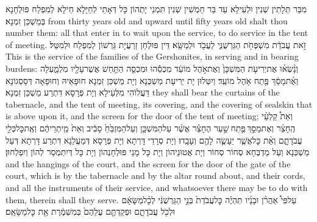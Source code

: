 {מִבַּר תְּלָתִין שְׁנִין וּלְעֵילָא עַד בַּר חַמְשִׁין שְׁנִין תִּמְנֵי יָתְהוֹן כָּל דְּאָתֵי לְחַיָּלָא חֵילָא לְמִפְלַח פּוּלְחָנָא בְּמַשְׁכַּן זִמְנָא׃}
{from thirty years old and upward until fifty years old shalt thou number them: all that enter in to wait upon the service, to do service in the tent of meeting.}{}
{זֹ֣את עֲבֹדַ֔ת מִשְׁפְּחֹ֖ת הַגֵּרְשֻׁנִּ֑י לַעֲבֹ֖ד וּלְמַשָּֽׂא׃}
{דֵּין פּוּלְחַן זַרְעֲיָת גֵּרְשׁוֹן לְמִפְלַח וּלְמִטַּל׃}
{This is the service of the families of the Gershonites, in serving and in bearing burdens:}{}
{וְנָ֨שְׂא֜וּ אֶת\maqqaf יְרִיעֹ֤ת הַמִּשְׁכָּן֙ וְאֶת\maqqaf אֹ֣הֶל מוֹעֵ֔ד מִכְסֵ֕הוּ וּמִכְסֵ֛ה הַתַּ֥חַשׁ אֲשֶׁר\maqqaf עָלָ֖יו מִלְמָ֑עְלָה וְאֶ֨ת\maqqaf מָסַ֔ךְ פֶּ֖תַח אֹ֥הֶל מוֹעֵֽד׃}
{וְיִטְּלוּן יָת יְרִיעָת מַשְׁכְּנָא וְיָת מַשְׁכַּן זִמְנָא חוּפָאֵיהּ וְחוּפָאָה דְּסָסְגוֹנָא דַּעֲלוֹהִי מִלְּעֵילָא וְיָת פְּרָסָא דִּתְרַע מַשְׁכַּן זִמְנָא׃}
{they shall bear the curtains of the tabernacle, and the tent of meeting, its covering, and the covering of sealskin that is above upon it, and the screen for the door of the tent of meeting;}{}
{וְאֵת֩ קַלְעֵ֨י הֶֽחָצֵ֜ר וְאֶת\maqqaf מָסַ֣ךְ \legarmeh  פֶּ֣תַח \legarmeh  שַׁ֣עַר הֶחָצֵ֗ר אֲשֶׁ֨ר עַל\maqqaf הַמִּשְׁכָּ֤ן וְעַל\maqqaf הַמִּזְבֵּ֙חַ֙ סָבִ֔יב וְאֵת֙ מֵֽיתְרֵיהֶ֔ם וְאֶֽת\maqqaf כׇּל\maqqaf כְּלֵ֖י עֲבֹדָתָ֑ם וְאֵ֨ת כׇּל\maqqaf אֲשֶׁ֧ר יֵעָשֶׂ֛ה לָהֶ֖ם וְעָבָֽדוּ׃}
{וְיָת סְרָדֵי דָּרְתָא וְיָת פְּרָסָא דְּמַעֲלַנָא דִּתְרַע דָּרְתָא דְּעַל מַשְׁכְּנָא וְעַל מַדְבְּחָא סְחוֹר סְחוֹר וְיָת אֲטוּנֵיהוֹן וְיָת כָּל מָנֵי פּוּלְחָנְהוֹן וְיָת כָּל דְּיִתְמְסַר לְהוֹן וְיִפְלְחוּן׃}
{and the hangings of the court, and the screen for the door of the gate of the court, which is by the tabernacle and by the altar round about, and their cords, and all the instruments of their service, and whatsoever there may be to do with them, therein shall they serve.}{}
{עַל\maqqaf פִּי֩ אַהֲרֹ֨ן וּבָנָ֜יו תִּהְיֶ֗ה כׇּל\maqqaf עֲבֹדַת֙ בְּנֵ֣י הַגֵּרְשֻׁנִּ֔י לְכׇ֨ל\maqqaf מַשָּׂאָ֔ם וּלְכֹ֖ל עֲבֹדָתָ֑ם וּפְקַדְתֶּ֤ם עֲלֵהֶם֙ בְּמִשְׁמֶ֔רֶת אֵ֖ת כׇּל\maqqaf מַשָּׂאָֽם׃}
